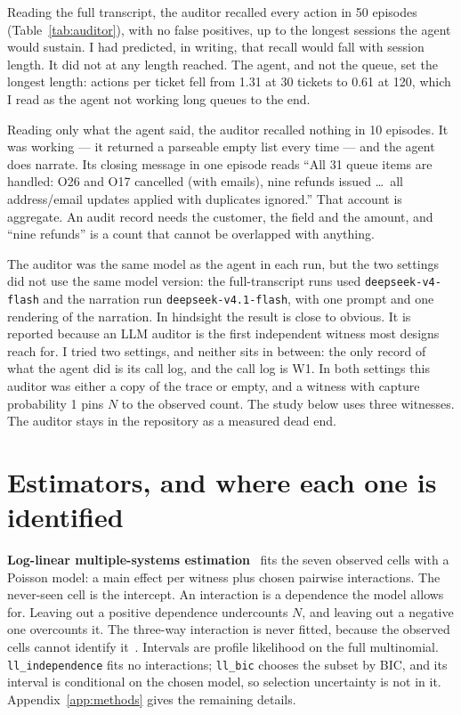 \documentclass[11pt]{article}
\begin{document}
\begin{table}[h]
\centering

\caption{The LLM auditor against the ledger. With the full transcript it is
perfect; with the agent's narration alone it reports nothing.}
\label{tab:auditor}
\end{table}

Reading the full transcript, the auditor recalled every action in 50 episodes
(Table~\ref{tab:auditor}), with no false positives, up to the longest sessions the
agent would sustain. I had predicted, in writing, that recall would fall with
session length. It did not at any length reached. The agent, and not the queue, set the
longest length: actions per ticket fell from 1.31 at 30 tickets to 0.61 at 120,
which I read as the agent not working long queues to the end.

Reading only what the agent said, the auditor recalled nothing in 10 episodes. It
was working --- it returned a parseable empty list every time --- and the agent
does narrate. Its closing message in one episode reads ``All 31 queue items are
handled: O26 and O17 cancelled (with emails), nine refunds issued \ldots\ all
address/email updates applied with duplicates ignored.'' That account is
aggregate. An audit record needs the customer, the field and the amount, and
``nine refunds'' is a count that cannot be overlapped with anything.

The auditor was the same model as the agent in each run, but the two settings
did not use the same model version: the full-transcript runs used
\texttt{deepseek-v4-flash} and the narration run \texttt{deepseek-v4.1-flash}, with
one prompt and one rendering of the narration. In hindsight the result is close
to obvious. It is reported because an LLM auditor is the first independent
witness most designs reach for. I tried two settings, and neither sits in
between: the only record of what the agent did is its call log, and the call
log is W1. In both settings this auditor was either a copy of the trace or empty,
and a witness with capture probability 1 pins $N$ to the observed count. The study below uses three witnesses. The auditor stays in the
repository as a measured dead end.

\section{Estimators, and where each one is identified}
\label{sec:estimators}

\textbf{Log-linear multiple-systems estimation}~\citep{fienberg1972} fits the
seven observed cells with a Poisson model: a main effect per witness plus chosen
pairwise interactions. The never-seen cell is the intercept. An interaction is a
dependence the model allows for. Leaving out a positive dependence undercounts
$N$, and leaving out a negative one overcounts it. The three-way interaction is never fitted, because the observed cells
cannot identify it~\citep{aleshinguendel2024}. Intervals are profile likelihood on
the full multinomial. \texttt{ll\_independence} fits no interactions;
\texttt{ll\_bic} chooses the subset by BIC, and its interval is conditional on
the chosen model, so selection uncertainty is not in it. Appendix~\ref{app:methods}
gives the remaining details.
\end{document}
